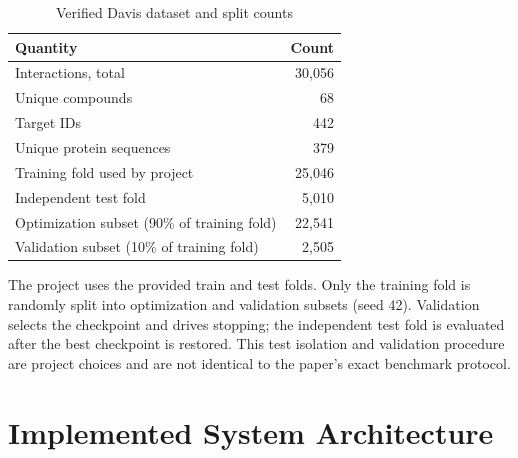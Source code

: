 \begin{table}[H]\centering\caption{Verified Davis dataset and split counts}\label{tab:data}\begin{tabular}{lr}\toprule Quantity & Count\\\midrule Interactions, total & 30,056\\Unique compounds & 68\\Target IDs & 442\\Unique protein sequences & 379\\Training fold used by project & 25,046\\Independent test fold & 5,010\\Optimization subset (90\% of training fold) & 22,541\\Validation subset (10\% of training fold) & 2,505\\\bottomrule\end{tabular}\end{table}

The project uses the provided train and test folds. Only the training fold is randomly split into optimization and validation subsets (seed 42). Validation selects the checkpoint and drives stopping; the independent test fold is evaluated after the best checkpoint is restored. This test isolation and validation procedure are project choices and are not identical to the paper's exact benchmark protocol.

\chapter{Implemented System Architecture}
